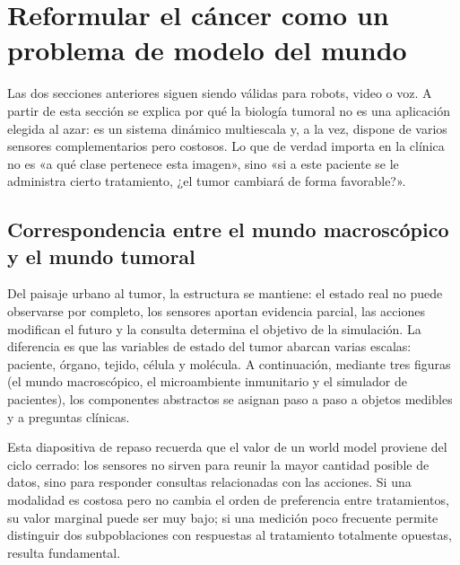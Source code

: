 \section{Reformular el cáncer como un problema de modelo del mundo}

Las dos secciones anteriores siguen siendo válidas para robots, video o voz. A partir de esta sección se explica por qué la biología tumoral no es una aplicación elegida al azar: es un sistema dinámico multiescala y, a la vez, dispone de varios sensores complementarios pero costosos. Lo que de verdad importa en la clínica no es «a qué clase pertenece esta imagen», sino «si a este paciente se le administra cierto tratamiento, ¿el tumor cambiará de forma favorable?».

\subsection{Correspondencia entre el mundo macroscópico y el mundo tumoral}

Del paisaje urbano al tumor, la estructura se mantiene: el estado real no puede observarse por completo, los sensores aportan evidencia parcial, las acciones modifican el futuro y la consulta determina el objetivo de la simulación. La diferencia es que las variables de estado del tumor abarcan varias escalas: paciente, órgano, tejido, célula y molécula. A continuación, mediante tres figuras (el mundo macroscópico, el microambiente inmunitario y el simulador de pacientes), los componentes abstractos se asignan paso a paso a objetos medibles y a preguntas clínicas.


Esta diapositiva de repaso recuerda que el valor de un world model proviene del ciclo cerrado: los sensores no sirven para reunir la mayor cantidad posible de datos, sino para responder consultas relacionadas con las acciones. Si una modalidad es costosa pero no cambia el orden de preferencia entre tratamientos, su valor marginal puede ser muy bajo; si una medición poco frecuente permite distinguir dos subpoblaciones con respuestas al tratamiento totalmente opuestas, resulta fundamental.


